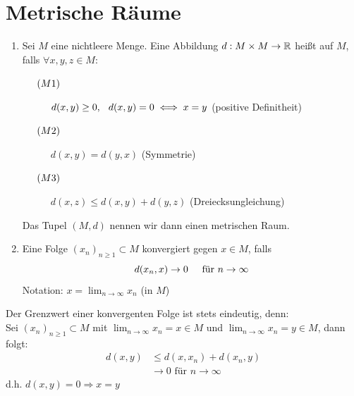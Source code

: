 
\chapter{Metrische R{\"a}ume}

\begin{definition}
	\begin{enumerate}[label=\alph*\upshape)]
		\item Sei $M$ eine nichtleere Menge. Eine Abbildung $d: M \times M \rightarrow 	\mathbb{R}$ hei{\ss}t  auf $M$, falls $\forall x, y, z \in M:$
			\begin{description}
				\item[$\hspace{0.5cm} (M1) \hspace{0.1cm} $] $d(x, y) \geq 0, \hspace{0.25cm} d(x, y) = 0 \iff x = y $  (positive Definitheit)
				\item[$\hspace{0.5cm} (M2) \hspace{0.1cm} $] $d(x, y) = d(y, x)$  (Symmetrie)
				\item[$\hspace{0.5cm} (M3) \hspace{0.1cm} $] $d(x, z) \leq d(x, y) + d(y, z)$  (Dreiecksungleichung)
			\end{description}
			Das Tupel $(M, d)$ nennen wir dann einen metrischen Raum. 
		\item Eine Folge $(x_{n})_{n \geq 1} \subset M$ konvergiert gegen $x \in M$, falls
			\[ d(x_{n}, x) \rightarrow 0 \hspace{0.5cm} \text{für } n \rightarrow \infty \]	 
			Notation: $x = \lim_{n \rightarrow \infty} x_{n}$ (in $M$)
	\end{enumerate}
\end{definition}

\begin{bemerkung*}
Der Grenzwert einer konvergenten Folge ist stets eindeutig, denn: \\
Sei $(x_{n})_{n \geq  1} \subset M$ mit $\lim_{n \rightarrow \infty} x_{n} = x \in M$ und $\lim_{n \rightarrow \infty} x_{n} = y \in M$, dann folgt: 
	\begin{align*}
		d(x, y) & \leq d(x, x_{n}) + d(x_{n}, y) \\
				& \rightarrow 0 \text{ für } n \rightarrow \infty
	\end{align*}
	d.h. $d(x, y) = 0 \Rightarrow x = y$
\end{bemerkung*}

